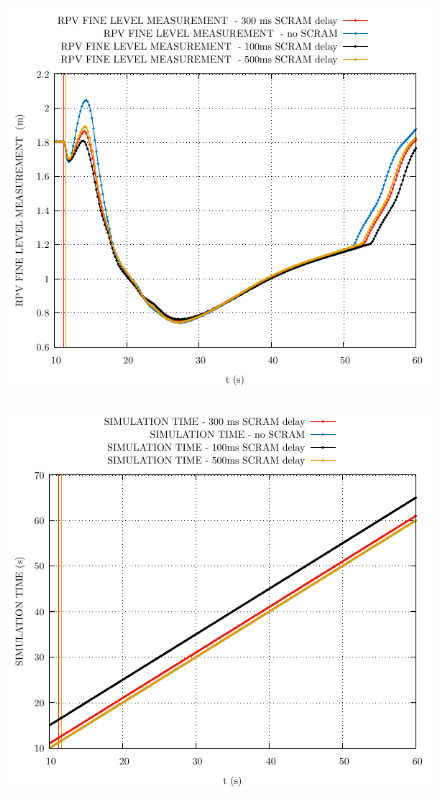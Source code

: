 \documentclass{article}
\begin{document}
\begin{multicols}{2}
\begin{figure}[H]
\end{figure}
\begin{figure}[H]
\centering
\includegraphics[width=\columnwidth]{./graphs/RPV FINE LEVEL MEASUREMENT _comp.pdf}
\end{figure}
\begin{figure}[H]
\centering
\includegraphics[width=\columnwidth]{./graphs/SIMULATION TIME_comp.pdf}

\end{figure}
\end{multicols}
\end{document}
